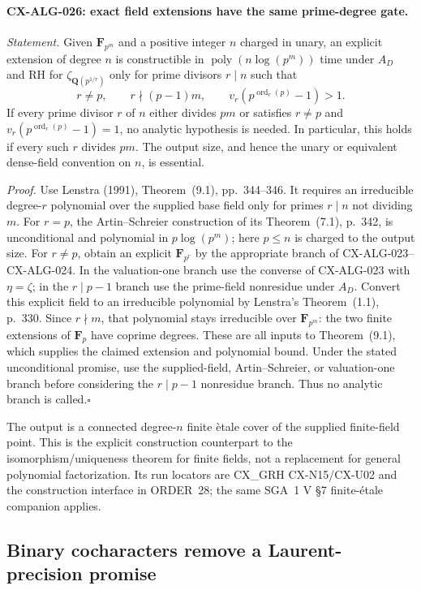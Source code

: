 \paragraph{CX-ALG-026: exact field extensions have the same prime-degree gate.}
\emph{Statement.} Given $\mathbf F_{p^m}$ and a positive integer $n$
charged in unary, an explicit extension of degree $n$ is constructible
in $\operatorname{poly}(n\log(p^m))$ time under $A_D$ and RH for
$\zeta_{\mathbf Q(p^{1/r})}$ only for prime divisors $r\mid n$ such that
\[
       r\ne p,\qquad r\nmid(p-1)m,\qquad
               v_r(p^{\operatorname{ord}_r(p)}-1)>1.
\]
If every prime divisor $r$ of $n$ either divides $pm$ or satisfies
$r\ne p$ and $v_r(p^{\operatorname{ord}_r(p)}-1)=1$, no analytic
hypothesis is needed. In particular, this holds if every such $r$ divides
$pm$. The output size, and hence the unary or equivalent dense-field
convention on $n$, is essential.

\emph{Proof.} Use Lenstra (1991), Theorem~(9.1), pp.~344--346.
It requires an irreducible degree-$r$ polynomial over the supplied base
field only for primes $r\mid n$ not dividing $m$.
For $r=p$, the Artin--Schreier construction of its Theorem~(7.1),
p.~342, is unconditional and polynomial in $p\log(p^m)$; here
$p\le n$ is charged to the output size. For $r\ne p$, obtain an
explicit $\mathbf F_{p^r}$ by the appropriate branch of
CX-ALG-023--CX-ALG-024. In the valuation-one branch use the converse
of CX-ALG-023 with $\eta=\zeta$; in the $r\mid p-1$ branch use
the prime-field nonresidue under $A_D$.
Convert this explicit field to an irreducible polynomial by Lenstra's
Theorem~(1.1), p.~330. Since $r\nmid m$, that polynomial stays
irreducible over $\mathbf F_{p^m}$: the two finite extensions of
$\mathbf F_p$ have coprime degrees. These are all inputs to
Theorem~(9.1), which supplies the claimed extension and polynomial
bound. Under the stated unconditional promise, use the supplied-field,
Artin--Schreier, or valuation-one branch before considering the
$r\mid p-1$ nonresidue branch. Thus no analytic branch is called.\hfill$\square$

The output is a connected degree-$n$ finite \`etale cover of the
supplied finite-field point. This is the explicit construction counterpart
to the isomorphism/uniqueness theorem for finite fields, not a replacement
for general polynomial factorization. Its run locators are CX\_GRH
CX-N15/CX-U02 and the construction interface in ORDER~28; the same
SGA~1 V \S7 finite-\'etale companion applies.

\subsection{Binary cocharacters remove a Laurent-precision promise}

